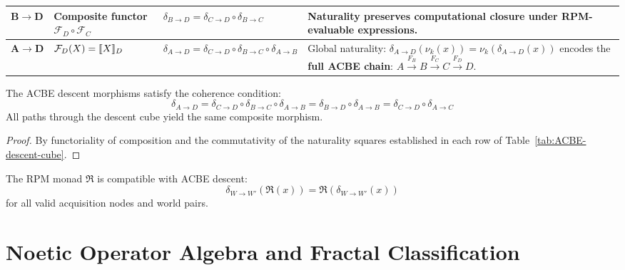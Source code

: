 \begin{longtable}{p{1.2cm}|p{2.2cm}|p{2.8cm}|p{6cm}}
$\mathbf{B \to D}$
& Composite functor $\mathcal{F}_D \circ \mathcal{F}_C$
& $\delta_{B\to D} = \delta_{C\to D} \circ \delta_{B\to C}$
& Naturality preserves computational closure under RPM-evaluable expressions.
\\
\midrule

$\mathbf{A \to D}$
& $\mathcal{F}_D(X) = \llbracket X \rrbracket_D$
& $\delta_{A\to D} = \delta_{C\to D} \circ \delta_{B\to C} \circ \delta_{A\to B}$
& Global naturality:
$\delta_{A\to D}(\nu_k(x)) = \nu_k(\delta_{A\to D}(x))$
encodes the \textbf{full ACBE chain}:
$A \xrightarrow{F_B} B \xrightarrow{F_C} C \xrightarrow{F_D} D$.
\\

\end{longtable}

\begin{theorem}
\label{thm:acbe-coherence}
The ACBE descent morphisms satisfy the coherence condition:
\[
\delta_{A\to D} = \delta_{C\to D} \circ \delta_{B\to C} \circ \delta_{A\to B}
= \delta_{B\to D} \circ \delta_{A\to B}
= \delta_{C\to D} \circ \delta_{A\to C}
\]
All paths through the descent cube yield the same composite morphism.
\end{theorem}

\begin{proof}
By functoriality of composition and the commutativity of the naturality squares
established in each row of Table~\ref{tab:ACBE-descent-cube}.
\end{proof}

\begin{corollary}
\label{cor:rpm-acbe}
The RPM monad $\mathfrak{R}$ is compatible with ACBE descent:
\[
\delta_{W\to W'}(\mathfrak{R}(x)) = \mathfrak{R}(\delta_{W\to W'}(x))
\]
for all valid acquisition nodes and world pairs.
\end{corollary}


\chapter{Noetic Operator Algebra and Fractal Classification}
\label{ch:noetic-algebra}

